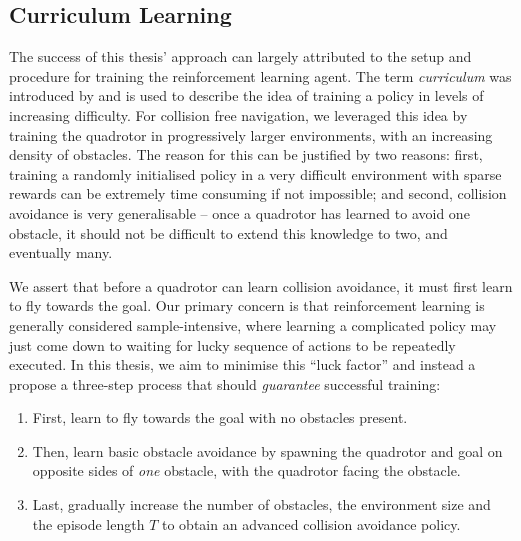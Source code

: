 \subsection{Curriculum Learning}
\label{subsec:5_curriculum}
The success of this thesis' approach can largely attributed to the setup and procedure for training the reinforcement learning agent.
The term \textit{curriculum} was introduced by \cite{LearningWalkMassivelyParallel} and is used to describe the idea of training a policy in levels of increasing difficulty. For collision free navigation, we leveraged this idea by training the quadrotor in progressively larger environments, with an increasing density of obstacles. The reason for this can be justified by two reasons: first, training a randomly initialised policy in a very difficult environment with sparse rewards can be extremely time consuming if not impossible; and second, collision avoidance is very generalisable -- once a quadrotor has learned to avoid one obstacle, it should not be difficult to extend this knowledge to two, and eventually many.

We assert that before a quadrotor can learn collision avoidance, it must first learn to fly towards the goal. Our primary concern is that reinforcement learning is generally considered sample-intensive, where learning a complicated policy may just come down to waiting for lucky sequence of actions to be repeatedly executed. In this thesis, we aim to minimise this ``luck factor'' and instead a propose a three-step process that should \textit{guarantee} successful training:
\begin{enumerate}
    \item First, learn to fly towards the goal with no obstacles present. 
    \item Then, learn basic obstacle avoidance by spawning the quadrotor and goal on opposite sides of \textit{one} obstacle, with the quadrotor facing the obstacle.
    \item Last, gradually increase the number of obstacles, the environment size and the episode length $T$ to obtain an advanced collision avoidance policy.
\end{enumerate}


